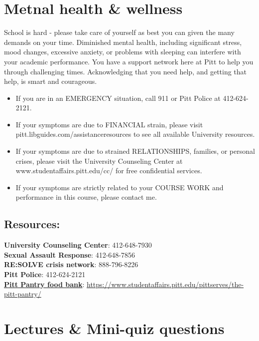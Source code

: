 \documentclass[
]{book}
\providecommand{\tightlist}{%
  \setlength{\itemsep}{0pt}\setlength{\parskip}{0pt}}
\begin{document}
\hypertarget{metnal-health-wellness}{%
\chapter{Metnal health \& wellness}\label{metnal-health-wellness}}

School is hard - please take care of yourself as best you can given the many demands on your time. Diminished mental health, including significant stress, mood changes, excessive anxiety, or problems with sleeping can interfere with your academic performance. You have a support network here at Pitt to help you through challenging times. Acknowledging that you need help, and getting that help, is smart and courageous.

\begin{itemize}
\tightlist
\item
  If you are in an EMERGENCY situation, call 911 or Pitt Police at 412-624-2121.
\item
  If your symptoms are due to FINANCIAL strain, please visit pitt.libguides.com/assistanceresources to see all available University resources.
\item
  If your symptoms are due to strained RELATIONSHIPS, families, or personal crises, please visit the University Counseling Center at www.studentaffairs.pitt.edu/cc/ for free confidential services.
\item
  If your symptoms are strictly related to your COURSE WORK and performance in this course, please contact me.
\end{itemize}

\hypertarget{resources}{%
\section{Resources:}\label{resources}}

\textbf{University Counseling Center}: 412-648-7930\\
\textbf{Sexual Assault Response}: 412-648-7856\\
\textbf{RE:SOLVE crisis network}: 888-796-8226\\
\textbf{Pitt Police}: 412-624-2121\\
\href{https://www.studentaffairs.pitt.edu/pittserves/the-pitt-pantry/}{\textbf{Pitt Pantry food bank}}: \url{https://www.studentaffairs.pitt.edu/pittserves/the-pitt-pantry/}

\hypertarget{lectures-mini-quiz-questions}{%
\chapter{Lectures \& Mini-quiz questions}\label{lectures-mini-quiz-questions}}
\end{document}
